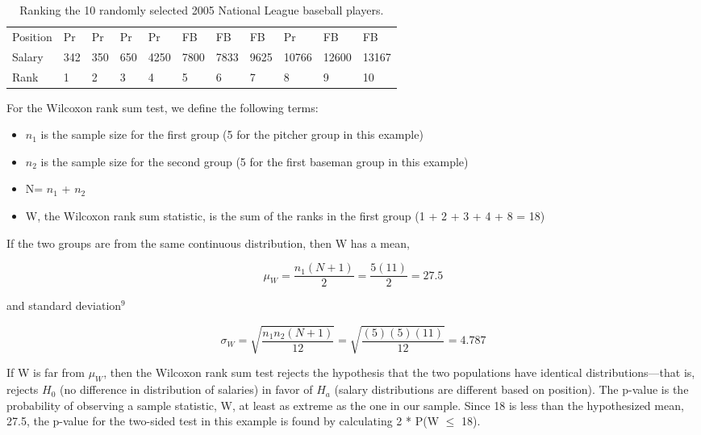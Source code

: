 \documentclass[
]{report}
\providecommand{\tightlist}{%
  \setlength{\itemsep}{0pt}\setlength{\parskip}{0pt}}
\theoremstyle{definition}
\theoremstyle{definition}
\theoremstyle{definition}
\theoremstyle{definition}
\theoremstyle{remark}
\begin{document}
\begin{table}

\caption{\label{tab:table3}Ranking the 10 randomly selected 2005 National League baseball players.}
\centering
\begin{tabular}[t]{lllllllllll}
\toprule
Position & Pr & Pr & Pr & Pr & FB & FB & FB & Pr & FB & FB\\
Salary & 342 & 350 & 650 & 4250 & 7800 & 7833 & 9625 & 10766 & 12600 & 13167\\
Rank & 1 & 2 & 3 & 4 & 5 & 6 & 7 & 8 & 9 & 10\\
\bottomrule
\end{tabular}
\end{table}

For the Wilcoxon rank sum test, we define the following terms:

\begin{itemize}
\tightlist
\item
  \(n_1\) is the sample size for the first group (5 for the pitcher group in this example)
\item
  \(n_2\) is the sample size for the second group (5 for the first baseman group in this example)
\item
  N= \(n_1\) + \(n_2\)
\item
  W, the Wilcoxon rank sum statistic, is the sum of the ranks in the first group
  (1 + 2 + 3 + 4 + 8 = 18)
\end{itemize}

If the two groups are from the same continuous distribution, then W has a mean,

\begin{equation} 
  \mu_W = \frac{n_1(N+1)}{2} = \frac{5(11)}{2}=27.5
  \tag{1.3} \label{eq:1_3}
\end{equation}

and standard deviation\(^9\)

\begin{equation} 
  \sigma_W = \sqrt{\frac{n_1n_2(N+1)}{12}} = \sqrt{\frac{(5)(5)(11)}{12}}= 4.787
  \tag{1.4} \label{eq:1_4}
\end{equation}

If W is far from \(\mu_W\), then the Wilcoxon rank sum test rejects the hypothesis that the two populations have identical distributions---that is, rejects \(H_0\) (no difference in distribution of salaries) in favor of \(H_a\) (salary distributions are different based on position). The p-value is the probability of observing a sample statistic, W, at least as extreme as the one in our sample. Since 18 is less than the hypothesized mean, 27.5, the p-value for the two-sided test in this example is found by calculating 2 * P(W \(\leq\) 18).
\end{document}
